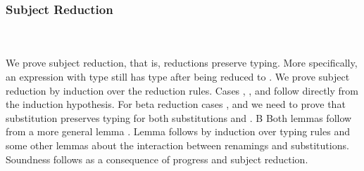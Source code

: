 \subsubsection{Subject Reduction}\hfill\\\\
We prove subject reduction, that is, reductions preserve typing. More specifically, an expression  with type  still has type  after being reduced to . We prove subject reduction by induction over the reduction rules. 
\FSubjectReduction
Cases , ,  and  follow directly from the induction hypothesis. 
For beta reduction cases ,  and  we need to prove that substitution preserves typing for both substitutions  \Data{[}  \Data{]} and  \Data{[}  \Data{]}. B
Both lemmas follow from a more general lemma . 
\Fpreserves
Lemma  follows by induction over typing rules and some other lemmas about the interaction between renamings and substitutions. Soundness follows as a consequence of progress and subject reduction. 